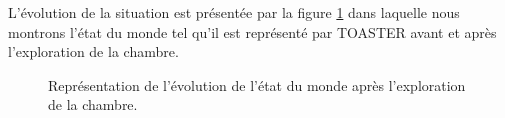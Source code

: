 \documentclass[a4paper,11pt,twoside]{StyleThese}
\begin{document}
L'évolution de la situation est présentée par la figure \ref{fig:mardiDemo2} dans laquelle nous montrons l'état du monde tel qu'il est représenté par TOASTER avant et après l'exploration de la chambre.



\begin{figure}[ht!]
  \begin{center}
    \caption {Représentation de l'évolution de l'état du monde après l'exploration de la chambre.}
  \label{fig:mardiDemo2}
  \end{center}
\end{figure}
\end{document}
